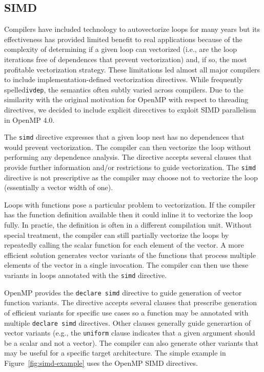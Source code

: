 \subsection{SIMD}
\label{sub:simd}

Compilers have included technology to autovectorize loops for many years 
but its effectiveness has provided limited benefit to real applications 
because of the complexity of determining if a given loop can vectorized 
(i.e., are the loop iterations free of dependences that prevent vectorization)
and, if so, the most profitable vectorization strategy. These limitations
led almost all major compilers to include implementation-defined 
vectorization directives. While frequently spelled\texttt{ivdep}, the
semantics often subtly varied across compilers. Due to the similarity 
with the original motivation for OpenMP with respect to threading 
directives, we decided to  include explicit direcctives to exploit 
SIMD parallelism in OpenMP 4.0.

The \texttt{simd} directive expresses that a given loop nest has no
dependences that would prevent vectorization. The compiler can then 
vectorize the loop without performing any dependence analysis. The 
directive accepts several clauses that provide further information 
and/or restrictions to guide vectorization. The \texttt{simd} directive 
is not prescriptive as the compiler may choose not to vectorize the 
loop (essentially a vector width of one).

Loops with functions pose a particular problem to vectorization. If the 
compiler has the function definition available then it could inline it 
to vectorize the loop fully. In practie, the definition is often in a
different compilation unit. Without special treatment, the compiler can
still partially vectorize the loops by repeatedly calling the scalar 
function for each element of the vector. A more efficient solution 
generates vector variants of the functions that process multiple 
elements of the vector in a single invocation. The compiler can then
use these variants in loops annotated with the \texttt{simd} directive.

OpenMP provides the \texttt{declare simd} directive to guide generation
of vector function variants. The directive accepts several clauses that
prescribe generation of efficient variants for specific use cases so a
function may be annotated with multiple \texttt{declare simd} directives.
Other clauses generally guide generartion of vector variants (e.g., the 
\texttt{uniform} clause indicates that a given argument should be a 
scalar and not a vector). The compiler can also generate other variants 
that may be useful for a specific target architecture. The simple example 
in Figure~\ref{fig:simd-example} uses the OpenMP SIMD directives.

